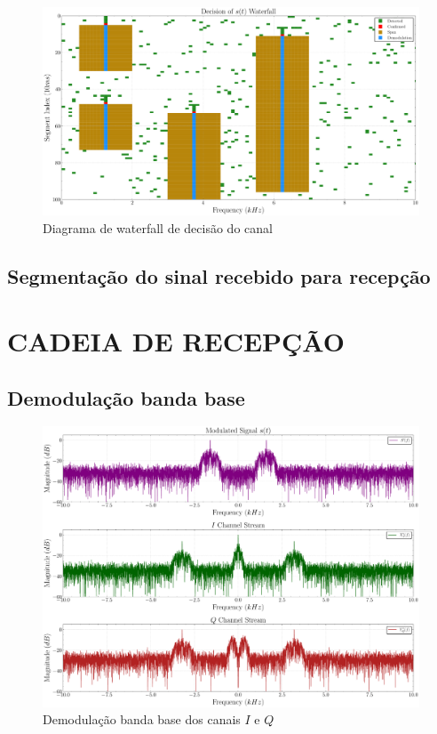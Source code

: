 \begin{figure}[H]
	\centering
	\caption{Diagrama de waterfall de decisão do canal}\label{fig:waterfall_decision}
	\includegraphics[width=\linewidth]{assets/cap3/example_detector_waterfall_decision.pdf}
\end{figure}

\subsection{Segmentação do sinal recebido para recepção}\label{sec:segmentacao_recepcao}

\section{CADEIA DE RECEPÇÃO}\label{sec:recepcao}    

\subsection{Demodulação banda base}\label{sec:demodulacao}

\begin{figure}[H]
	\centering
	\caption{Demodulação banda base dos canais $I$ e $Q$}\label{fig:receiver_demodulator}
	\includegraphics[width=\linewidth]{assets/cap3/receiver_demodulator_freq.pdf}
\end{figure}

